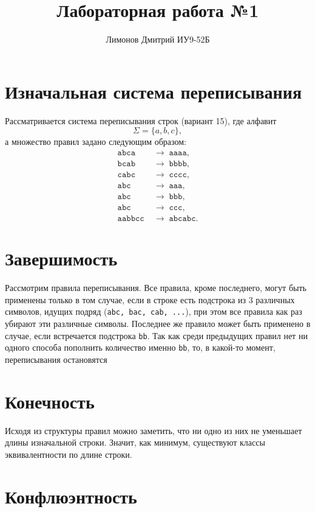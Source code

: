 \documentclass[a4paper,12pt]{article}
\title{Лабораторная работа №1}
\author{Лимонов Дмитрий ИУ9-52Б}
\begin{document}
\maketitle

\section*{Изначальная система переписывания}

Рассматривается система переписывания строк (вариант 15), где алфавит
\[
\Sigma = \{a,b,c\},
\]
а множество правил задано следующим образом:
\[
\begin{aligned}
\texttt{abca} &\;\to\; \texttt{aaaa},\\
\texttt{bcab} &\;\to\; \texttt{bbbb},\\
\texttt{cabc} &\;\to\; \texttt{cccc},\\
\texttt{abc}  &\;\to\; \texttt{aaa},\\
\texttt{abc}  &\;\to\; \texttt{bbb},\\
\texttt{abc}  &\;\to\; \texttt{ccc},\\
\texttt{aabbcc} &\;\to\; \texttt{abcabc}.
\end{aligned}
\]

\section*{Завершимость}

Рассмотрим правила переписывания. Все правила, кроме последнего, могут быть применены только в том случае, если в строке есть подстрока из 3 различных символов, идущих подряд (\texttt{abc, bac, cab, ...}), при этом все правила как раз убирают эти различные символы. Последнее же правило может быть применено в случае, если встречается подстрока \texttt{bb}. Так как среди предыдущих правил нет ни одного способа пополнить количество именно \texttt{bb}, то, в какой-то момент, переписывания остановятся

\section*{Конечность}

Исходя из структуры правил можно заметить, что ни одно из них не уменьшает длины изначальной строки. Значит, как минимум, существуют классы эквивалентности по длине строки.


\section*{Конфлюэнтность}
\end{document}
